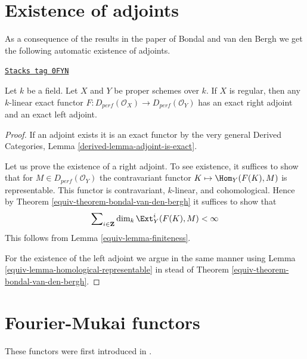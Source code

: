 \section{Existence of adjoints}
\label{equiv-section-adjoints}
As a consequence of the results in the paper of Bondal and van den Bergh
we get the following automatic existence of adjoints.

\begin{lemma}
\label{equiv-lemma-always-right-adjoints}
\href{https://stacks.math.columbia.edu/tag/0FYN}{\texttt{Stacks tag 0FYN}}

Let $k$ be a field. Let $X$ and $Y$ be proper schemes over $k$.
If $X$ is regular, then any $k$-linear exact functor
$F : D_{perf}(\mathcal{O}_X) \to D_{perf}(\mathcal{O}_Y)$
has an exact right adjoint and an exact left adjoint.
\end{lemma}

\begin{proof}

If an adjoint exists it is an exact functor by the very general
Derived Categories, Lemma \ref{derived-lemma-adjoint-is-exact}.

\medskip\noindent
Let us prove the existence of a right adjoint.
To see existence, it suffices to show that for
$M \in D_{perf}(\mathcal{O}_Y)$ the contravariant functor
$K \mapsto \Hom_Y(F(K), M)$ is representable.
This functor is contravariant, $k$-linear, and cohomological.
Hence by Theorem \ref{equiv-theorem-bondal-van-den-bergh}
it suffices to show that
$$
\sum\nolimits_{i \in \mathbf{Z}} \dim_k \Ext^i_Y(F(K), M) < \infty
$$
This follows from Lemma \ref{equiv-lemma-finiteness}.

\medskip\noindent
For the existence of the left adjoint we argue in the same
manner using Lemma \ref{equiv-lemma-homological-representable}
in stead of Theorem \ref{equiv-theorem-bondal-van-den-bergh}.
\end{proof}

\section{Fourier-Mukai functors}
\label{equiv-section-fourier-mukai}
These functors were first introduced in \cite{Mukai}.

